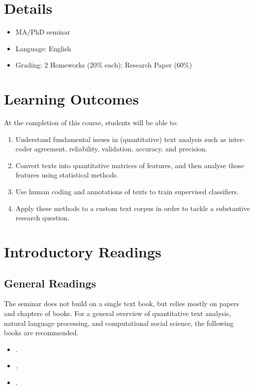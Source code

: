 \documentclass[abstract=on,parskip=full,headings=standardclasses,fontsize=11pt,paper=a4]{scrartcl}
\begin{document}
\section*{Details}

\begin{itemize}
\item MA/PhD seminar
\item  Language: English
\item Grading: 2 Homeworks (20\% each); Research Paper (60\%)
\end{itemize}

\section*{Learning Outcomes}

At the completion of this course, students will be able to:
\begin{enumerate}
\item Understand fundamental issues in (quantitative) text analysis such as inter-coder agreement, reliability, validation, accuracy, and precision.
\item Convert texts into quantitative matrices of features, and then analyse those features using statistical methods.
\item Use human coding and annotations of texts to train supervised classifiers.
\item  Apply these methods to a custom text corpus in order to tackle a substantive research question.
\end{enumerate}


\section*{Introductory Readings}

\subsection*{General Readings}

The seminar does not build on a single text book, but relies mostly on papers and chapters of books. For  a general overview of quantitative text analysis, natural language processing, and computational social science, the following books are recommended.

\begin{itemize}
\item {}.
\item {}.
\item {}.
\end{itemize}
\end{document}
